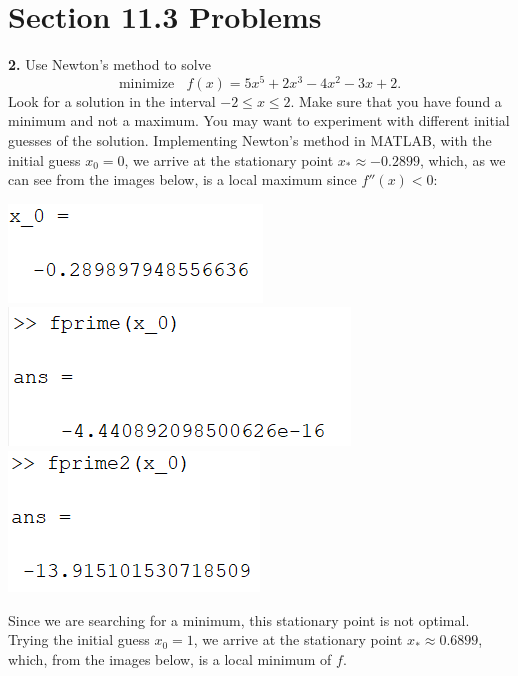 \documentclass{article}
\begin{document}
\section*{Section 11.3 Problems}
\textbf{2.} Use Newton's method to solve
\[\text{minimize} \:\:\:\: f(x) = 5x^5 + 2x^3 - 4x^2 - 3x + 2.\]
Look for a solution in the interval $-2 \leq x \leq 2$. Make sure that you have found a minimum and not a maximum. You may want to experiment with different initial guesses of the solution.
\newline\newline
Implementing Newton's method in MATLAB, with the initial guess $x_0 = 0$, we arrive at the stationary point $x_* \approx -0.2899$, which, as we can see from the images below, is a local maximum since $f''(x) < 0$:
\begin{center}
    \includegraphics[scale = 0.9]{initGuess_0}
    \includegraphics[scale = 0.9]{fprime_init_0}
    \includegraphics[scale = 0.9]{fprime2_0}
    \newline\newline\newline
\end{center}
Since we are searching for a minimum, this stationary point is not optimal. Trying the initial guess $x_0 = 1$, we arrive at the stationary point $x_* \approx 0.6899$, which, from the images below, is a local minimum of $f$.
\newline\newline
\end{document}
